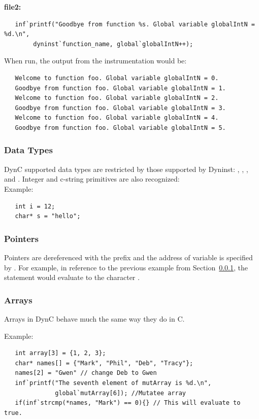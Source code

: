 \noindent \textbf{file2:}
\begin{lstlisting}
   inf`printf("Goodbye from function %s. Global variable globalIntN = %d.\n",
        dyninst`function_name, global`globalIntN++);
\end{lstlisting}

\noindent When run, the output from the instrumentation would be:
\begin{lstlisting}
   Welcome to function foo. Global variable globalIntN = 0.
   Goodbye from function foo. Global variable globalIntN = 1.
   Welcome to function foo. Global variable globalIntN = 2.
   Goodbye from function foo. Global variable globalIntN = 3.
   Welcome to function foo. Global variable globalIntN = 4.
   Goodbye from function foo. Global variable globalIntN = 5.
\end{lstlisting}

\subsubsection{Data Types}
\label{dataTypes}
DynC supported data types are restricted by those supported by Dyninst: , , , and . Integer and c-string primitives are also recognized:\\

\noindent Example:
\begin{lstlisting}
   int i = 12;
   char* s = "hello";
\end{lstlisting}

\subsubsection{Pointers}
Pointers are dereferenced with the prefix  and the address of
variable is specified by .
For example, in reference to the previous example from Section~\ref{dataTypes}, the statement  would evaluate to the character .

\subsubsection{Arrays}
Arrays in DynC behave much the same way they do in C.

\noindent Example:
\begin{lstlisting}
   int array[3] = {1, 2, 3};
   char* names[] = {"Mark", "Phil", "Deb", "Tracy"};
   names[2] = "Gwen" // change Deb to Gwen
   inf`printf("The seventh element of mutArray is %d.\n",
              global`mutArray[6]); //Mutatee array
   if(inf`strcmp(*names, "Mark") == 0){} // This will evaluate to true.
\end{lstlisting}

